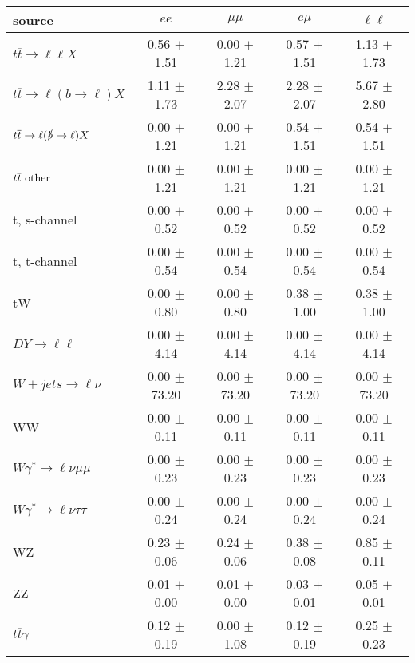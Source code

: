 \begin{tabular}{l|cccc} \hline\hline
source & $ee$ & $\mu\mu$ & $e\mu$ & $\ell\ell $ \\
\hline
$t\overline{t} \rightarrow \ell \ell X$ &  0.56 $\pm$  1.51 &  0.00 $\pm$  1.21 &  0.57 $\pm$  1.51 &  1.13 $\pm$  1.73 \\
$t\overline{t} \rightarrow \ell (b \rightarrow \ell) X$ &  1.11 $\pm$  1.73 &  2.28 $\pm$  2.07 &  2.28 $\pm$  2.07 &  5.67 $\pm$  2.80 \\
$t\overline{t} \rightarrow \ell (\slashed b \rightarrow \ell) X$ &  0.00 $\pm$  1.21 &  0.00 $\pm$  1.21 &  0.54 $\pm$  1.51 &  0.54 $\pm$  1.51 \\
        $t\overline{t}\ \rm{other}$ &  0.00 $\pm$  1.21 &  0.00 $\pm$  1.21 &  0.00 $\pm$  1.21 &  0.00 $\pm$  1.21 \\
\hline
                       t, s-channel &  0.00 $\pm$  0.52 &  0.00 $\pm$  0.52 &  0.00 $\pm$  0.52 &  0.00 $\pm$  0.52 \\
                       t, t-channel &  0.00 $\pm$  0.54 &  0.00 $\pm$  0.54 &  0.00 $\pm$  0.54 &  0.00 $\pm$  0.54 \\
                                 tW &  0.00 $\pm$  0.80 &  0.00 $\pm$  0.80 &  0.38 $\pm$  1.00 &  0.38 $\pm$  1.00 \\
\hline
         $DY \rightarrow \ell \ell$ &  0.00 $\pm$  4.14 &  0.00 $\pm$  4.14 &  0.00 $\pm$  4.14 &  0.00 $\pm$  4.14 \\
      $W+jets \rightarrow \ell \nu$ &  0.00 $\pm$ 73.20 &  0.00 $\pm$ 73.20 &  0.00 $\pm$ 73.20 &  0.00 $\pm$ 73.20 \\
                                 WW &  0.00 $\pm$  0.11 &  0.00 $\pm$  0.11 &  0.00 $\pm$  0.11 &  0.00 $\pm$  0.11 \\
\hline
$W\gamma^{*} \rightarrow \ell \nu \mu\mu$ &  0.00 $\pm$  0.23 &  0.00 $\pm$  0.23 &  0.00 $\pm$  0.23 &  0.00 $\pm$  0.23 \\
$W\gamma^{*} \rightarrow \ell \nu \tau\tau$ &  0.00 $\pm$  0.24 &  0.00 $\pm$  0.24 &  0.00 $\pm$  0.24 &  0.00 $\pm$  0.24 \\
                                 WZ &  0.23 $\pm$  0.06 &  0.24 $\pm$  0.06 &  0.38 $\pm$  0.08 &  0.85 $\pm$  0.11 \\
                                 ZZ &  0.01 $\pm$  0.00 &  0.01 $\pm$  0.00 &  0.03 $\pm$  0.01 &  0.05 $\pm$  0.01 \\
\hline
              $t\overline{t}\gamma$ &  0.12 $\pm$  0.19 &  0.00 $\pm$  1.08 &  0.12 $\pm$  0.19 &  0.25 $\pm$  0.23 \\

\end{tabular}
